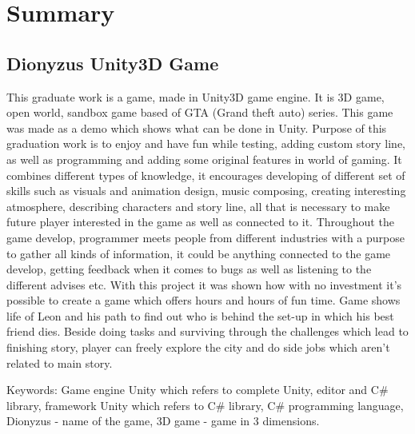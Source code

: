 \section*{Summary}
\subsection*{Dionyzus Unity3D Game}
This graduate work is a game, made in Unity3D game engine. It is 3D game, open world, sandbox game based of GTA (Grand theft auto) series. This game was made as a demo which shows what can be done in Unity. Purpose of this graduation work is to enjoy and have fun while testing, adding custom story line, as well as programming and adding some original features in world of gaming.
It combines different types of knowledge, it encourages developing of different set of skills such as visuals and animation design, music composing, creating interesting atmosphere, describing characters and story line, all that is necessary to make future player interested in the game as well as connected to it. Throughout the game develop, programmer meets people from different industries with a purpose to gather all kinds of information, it could be anything connected to the game develop, getting feedback when it comes to bugs as well as listening to the different advises etc. With this project it was shown how with no investment it's possible to create a game which offers hours and hours of fun time.
Game shows life of Leon and his path to find out who is behind the set-up in which his best friend dies. Beside doing tasks and surviving through the challenges which lead to finishing story, player can freely explore the city and do side jobs which aren't related to main story.

Keywords: Game engine Unity which refers to complete Unity, editor and C\# library, framework Unity which refers to C\# library, C\# programming language, Dionyzus - name of the game, 3D game - game in 3 dimensions.